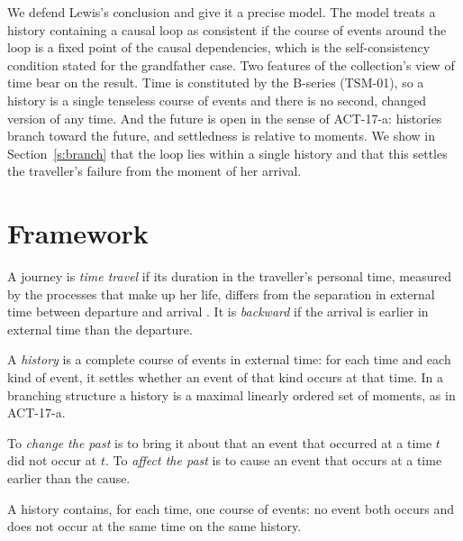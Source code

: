\documentclass{situationist-preprint}
\begin{document}
We defend Lewis's conclusion and give it a precise model. The model treats a history containing a causal loop as consistent if the course of events around the loop is a fixed point of the causal dependencies, which is the self-consistency condition stated for the grandfather case. Two features of the collection's view of time bear on the result. Time is constituted by the B-series (TSM-01), so a history is a single tenseless course of events and there is no second, changed version of any time. And the future is open in the sense of ACT-17-a: histories branch toward the future, and settledness is relative to moments. We show in Section~\ref{s:branch} that the loop lies within a single history and that this settles the traveller's failure from the moment of her arrival.

\section{Framework}

\begin{definition}\label{d:travel}
A journey is \emph{time travel} if its duration in the traveller's personal time, measured by the processes that make up her life, differs from the separation in external time between departure and arrival \citep{Lewis1976}. It is \emph{backward} if the arrival is earlier in external time than the departure.
\end{definition}

\begin{definition}[History]\label{d:history}
A \emph{history} is a complete course of events in external time: for each time and each kind of event, it settles whether an event of that kind occurs at that time. In a branching structure a history is a maximal linearly ordered set of moments, as in ACT-17-a.
\end{definition}

\begin{definition}\label{d:change}
To \emph{change the past} is to bring it about that an event that occurred at a time $t$ did not occur at $t$. To \emph{affect the past} is to cause an event that occurs at a time earlier than the cause.
\end{definition}

\begin{assumption}\label{a:onecourse}
A history contains, for each time, one course of events: no event both occurs and does not occur at the same time on the same history.
\end{assumption}
\end{document}
